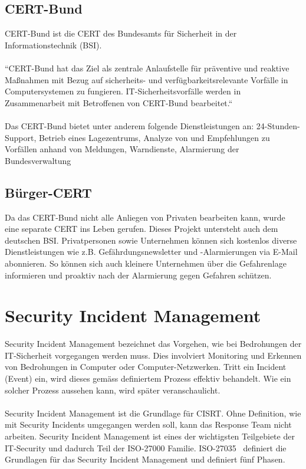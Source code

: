 \subsection{CERT-Bund}

CERT-Bund ist die CERT des  Bundesamts für Sicherheit in der Informationstechnik (BSI). \\
\\
``CERT-Bund hat das Ziel als zentrale Anlaufstelle für präventive und reaktive Maßnahmen mit Bezug auf sicherheits- und verfügbarkeitsrelevante Vorfälle in Computersystemen zu fungieren. IT-Sicherheitsvorfälle werden in Zusammenarbeit mit Betroffenen von CERT-Bund bearbeitet.``~\citep{certbund} \\
\\
Das CERT-Bund bietet unter anderem folgende Dienstleistungen an: 24-Stunden-Support, Betrieb eines Lagezentrums, Analyze von und Empfehlungen zu Vorfällen anhand von Meldungen, Warndienste, Alarmierung der Bundesverwaltung

\subsection{Bürger-CERT}
Da das CERT-Bund nicht alle Anliegen von Privaten bearbeiten kann, wurde eine separate CERT ins Leben gerufen. Dieses Projekt untersteht auch dem deutschen BSI. Privatpersonen sowie Unternehmen können sich kostenlos diverse Dienstleistungen wie z.B. Gefährdungsnewsletter und -Alarmierungen via E-Mail abonnieren. So können sich auch kleinere Unternehmen über die Gefahrenlage informieren und proaktiv nach der Alarmierung gegen Gefahren schützen.

\section{Security Incident Management}
Security Incident Management bezeichnet das Vorgehen, wie bei Bedrohungen der IT-Sicherheit vorgegangen werden muss. Dies involviert Monitoring und Erkennen von Bedrohungen in Computer oder Computer-Netzwerken. Tritt ein Incident (Event) ein, wird dieses gemäss definiertem Prozess effektiv behandelt. Wie ein solcher Prozess aussehen kann, wird später veranschaulicht. \\
\\
Security Incident Management ist die Grundlage für CISRT. Ohne Definition, wie mit Security Incidents umgegangen werden soll, kann das Response Team nicht arbeiten. Security Incident Management ist eines der wichtigsten Teilgebiete der IT-Security und dadurch Teil der ISO-27000 Familie. ISO-27035~\citep{iso27035} definiert die Grundlagen für das Security Incident Management und definiert fünf Phasen.


